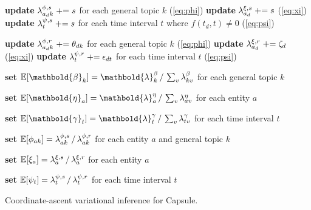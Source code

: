\begin{algorithm}[p]
{{		\textbf{update} $\lambda^{\phi,s}_{a_d k} \mathrel{+}= s$
		for each general topic $k$ (\cref{eq:phi}) \;
		\textbf{update} $\lambda^{\xi,s}_{a_d} \mathrel{+}= s$
		(\cref{eq:xi})\;
		\textbf{update} $\lambda^{\psi,s}_{t} \mathrel{+}=
		s$ for each time interval $t$ where $f(t_d, t) \neq 0$
		(\cref{eq:psi}) \;

		\textbf{update} $\lambda^{\phi,r}_{a_d
		k} \mathrel{+}= \theta_{dk}$ for each general topic $k$ (\cref{eq:phi}) \;
		\textbf{update}
		$\lambda^{\xi,r}_{a_d} \mathrel{+}= \zeta_d$
		(\cref{eq:xi}) \;
		\textbf{update}
		$\lambda^{\psi,r}_t \mathrel{+}= \epsilon_{dt}$ for each
		time interval $t$ (\cref{eq:psi}) \;

	}

	\textbf{set} $\E[\mathbold{\beta}_{k}]
	= \mathbold{\lambda}^{\beta}_{k} \,/\, \sum_v \lambda^{\beta}_{kv}$
	for each general topic $k$ \;

	\textbf{set} $\E[\mathbold{\eta}_{a}]
	= \mathbold{\lambda}^{\eta}_{a} \,/\, \sum_v \lambda^{\eta}_{av}$
	for each entity $a$ \;

	\textbf{set} $\E[\mathbold{\gamma}_t]
	= \mathbold{\lambda}^{\gamma}_t \,/\, \sum_v \lambda^{\gamma}_{tv}$
	for each time interval $t$ \;

	\textbf{set} $\mathbb{E}[\phi_{ak}] = \lambda^{\phi,s}_{ak}
	\,/\, \lambda^{\phi,r}_{ak}$ for each entity $a$ and general
	topic $k$ \;

	\textbf{set} $\mathbb{E}[\xi_{a}] = \lambda^{\xi,s}_a
	\,/\, \lambda^{\xi,r}_a$ for each entity $a$\;

	\textbf{set} $\mathbb{E}[\psi_t]
	= \lambda^{\psi,s}_t \,/\, \lambda^{\psi,r}_t$ for each time interval $t$\;

}
\Return{$\mathbold{\lambda}$} \;
\caption{Coordinate-ascent variational inference for Capsule.}
\label{alg:capsule}
\end{algorithm}
